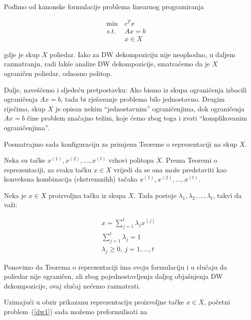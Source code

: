 \documentclass[a4paper, utf8, 11pt, colorlinks]{book}
\theoremstyle{definition}
\begin{document}
 Pođimo od kanonske formulacije problema linearnog programiranja
 
  \begin{equation}
 	\begin{aligned}\label{dw1}
 		\min\  &c^Tx\\
 		s.t.\  &Ax=b\\
 		&x \in X
 	\end{aligned}
 \end{equation}
 
 gdje je skup $X$ poliedar. Iako za DW dekompoziciju nije neophodno, u daljem razmatranju, radi lakše analize DW dekompozicije, smatraćemo da je $X$ ograničen poliedar, odnosno politop.
 
 Dalje, navešćemo i sljedeću pretpostavku: Ako bismo iz skupa ograničenja izbacili ograničenja $Ax=b$, tada bi rješavanje problema bilo jednostavno. Drugim riječima, skup $X$ je opisan nekim ``jednostavnim'' ograničenjima, dok ograničenja $Ax=b$ čine problem značajno težim, koje ćemo zbog toga i zvati ``komplikovanim ograničenjima''. 
 
 Posmatrajmo sada konfiguraciju za primjenu Teoreme o reprezentaciji na skup $X$.
 
 Neka su tačke $x^{(1)},x^{(2)},\dots,x^{(t)}$ vrhovi politopa $X$.  
 Prema Teoremi o reprezentaciji, za svaku tačku $x\in X$ vrijedi da se ona može predstaviti kao konveksna kombinacija (ekstremnihh) tačaka $x^{(1)},x^{(2)},\dots,x^{(t)}$.
 
 Neka je  $x \in X$ proizvoljna tačka iz skupa $X$.  Tada postoje $\lambda_1,\lambda_2,\ldots,\lambda_t$, takvi da važi:
 
 \begin{equation}
 	\begin{aligned}
 		&x = \sum_{j=1}^t\lambda_jx^{(j)}\\
 		 &\sum_{j=1}^t\lambda_j = 1\\
 		&\lambda_j\geqslant 0,\ j = 1,\ldots,t
 	\end{aligned}
 \end{equation}
 
 Ponovimo da Teorema o reprezentaciji ima svoju formulaciju i u slučaju da poliedar nije ograničen, ali zbog pojednostavljenja daljeg objašnjenja DW dekompozicije, ovaj slučaj nećemo razmatrati.
 
 Uzimajući u obzir prikazanu reprezentaciju proizvoljne tačke $x\in X$, početni problem~(\ref{dw1}) sada možemo preformulisati na
 
\end{document}
